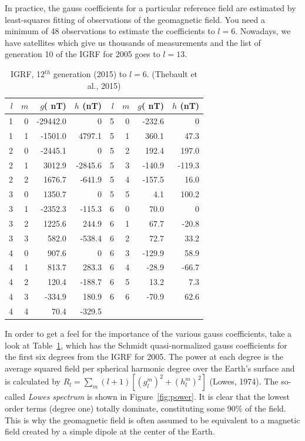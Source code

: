 In practice, the   gauss
coefficients for a particular reference field are estimated by least-squares fitting of  observations of the geomagnetic field.  You need a minimum of  48
observations to estimate the coefficients to $l=6$.  Nowadays, we have satellites which give us  thousands of measurements and the list of generation 10 of the IGRF for 2005 goes to $l=13$.  


\begin{table}[h!tb]
\begin{center}
\caption {IGRF,  12$^{th}$ generation (2015) to $l=6$. (Thebault et al., 2015)}
\label{tab:igrf15}
\begin{tabular}{r r r r|rrrr}
\hline
$l$&$m$&$g $( nT) &$h$ (nT) & $l$&$m$&$g $( nT) &$h$ (nT) \\
\hline
1 & 0 & -29442.0 & 0 & 5 & 0 & -232.6 & 0\\
1 & 1 & -1501.0 & 4797.1 & 5 & 1 & 360.1 & 47.3\\
2 & 0 & -2445.1 & 0 & 5 & 2 & 192.4 & 197.0\\
2 & 1 & 3012.9 & -2845.6 & 5 & 3 & -140.9 & -119.3\\
2 & 2 & 1676.7 & -641.9 & 5 & 4 & -157.5 & 16.0\\
3 & 0 & 1350.7 & 0 & 5 & 5 & 4.1 & 100.2\\
3 & 1 & -2352.3 & -115.3 & 6 & 0 & 70.0 & 0\\
3 & 2 & 1225.6 & 244.9 & 6 & 1 & 67.7 & -20.8\\
3 & 3 & 582.0 & -538.4 & 6 & 2 & 72.7 & 33.2\\ 
4 & 0 & 907.6 & 0 & 6 & 3 & -129.9 & 58.9\\
4 & 1 & 813.7 & 283.3 & 6 & 4 & -28.9 & -66.7\\
4 & 2 & 120.4 & -188.7 & 6 & 5 & 13.2 & 7.3\\
4 & 3 & -334.9 & 180.9 & 6 & 6 & -70.9 & 62.6\\ 
4 & 4 & 70.4 & -329.5 \\
 \hline
\end{tabular}
\end{center}
\end{table}
  \nocite{thebault15}


In order to get a feel for the importance of the various gauss coefficients, take a look at Table~\ref{tab:igrf15}, which has the Schmidt quasi-normalized gauss coefficients for the first six degrees from the IGRF for 2005.   
The power at each degree is the average squared field per spherical harmonic degree over the Earth's surface and is calculated by  $R_l=\sum_m (l+1)[(g_l^m)^2 + (h_l^m)^2]$
 \nocite{lowes74} 
(Lowes, 1974). 
The  so-called 
{\it Lowes spectrum} is shown in 
Figure~\ref{fig:power}.  It is clear that the lowest order terms (degree one) totally
dominate,   constituting some 90\% of the field.    This is why the geomagnetic field is often assumed to be equivalent to a magnetic field created by a simple dipole at the center of the Earth.   



